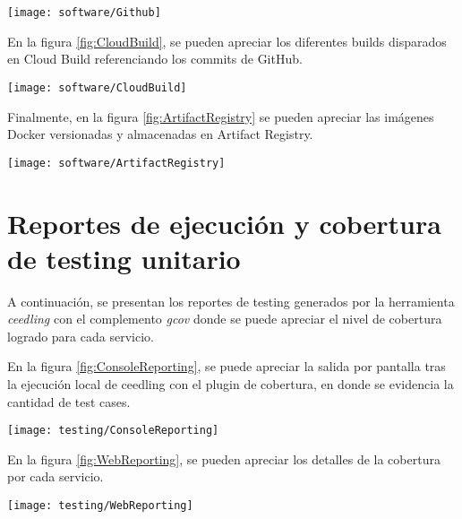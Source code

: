 \begin{center}
   \texttt{[image: software/Github]}
   \label{fig:Github}
\end{center}


En la figura \ref{fig:CloudBuild}, se pueden apreciar los diferentes builds disparados en Cloud Build referenciando los commits de GitHub.

\begin{center}
   \texttt{[image: software/CloudBuild]}
   \label{fig:CloudBuild}
\end{center}

Finalmente, en la figura \ref{fig:ArtifactRegistry} se pueden apreciar las imágenes Docker versionadas y almacenadas en Artifact Registry.

\begin{center}
   \texttt{[image: software/ArtifactRegistry]}
   \label{fig:ArtifactRegistry}
\end{center}






\section{Reportes de ejecución y cobertura de testing unitario}

A continuación, se presentan los reportes de testing generados por la herramienta \textit{ceedling} con el complemento \textit{gcov} donde se puede apreciar el nivel de cobertura logrado para cada servicio.

En la figura \ref{fig:ConsoleReporting}, se puede apreciar la salida por pantalla tras la ejecución local de ceedling con el plugin de cobertura, en donde se evidencia la cantidad de test cases. 

\begin{center}
   \texttt{[image: testing/ConsoleReporting]}
   \label{fig:ConsoleReporting}
\end{center}

En la figura \ref{fig:WebReporting}, se pueden apreciar los detalles de la cobertura por cada servicio.

\begin{center}
   \texttt{[image: testing/WebReporting]}
   \label{fig:WebReporting}
\end{center}







